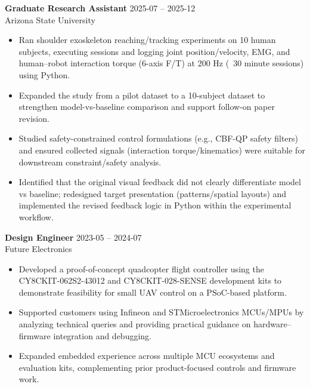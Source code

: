 \documentclass[11pt]{article}
\begin{document}
\vspace{4pt}

\textbf{ Graduate Research Assistant } \hfill 2025-07 -- 2025-12\\
Arizona State University \\

\begin{itemize}[leftmargin=*,noitemsep]
  
  \item Ran shoulder exoskeleton reaching/tracking experiments on 10 human subjects, executing sessions and logging joint position/velocity, EMG, and human–robot interaction torque (6-axis F/T) at 200 Hz (~30 minute sessions) using Python.
  
  \item Expanded the study from a pilot dataset to a 10-subject dataset to strengthen model-vs-baseline comparison and support follow-on paper revision.
  
  \item Studied safety-constrained control formulations (e.g., CBF-QP safety filters) and ensured collected signals (interaction torque/kinematics) were suitable for downstream constraint/safety analysis.
  
  \item Identified that the original visual feedback did not clearly differentiate model vs baseline; redesigned target presentation (patterns/spatial layouts) and implemented the revised feedback logic in Python within the experimental workflow.
  
\end{itemize}

\vspace{4pt}

\textbf{ Design Engineer } \hfill 2023-05 -- 2024-07\\
Future Electronics \\

\begin{itemize}[leftmargin=*,noitemsep]
  
  \item Developed a proof-of-concept quadcopter flight controller using the CY8CKIT-062S2-43012 and CY8CKIT-028-SENSE development kits to demonstrate feasibility for small UAV control on a PSoC-based platform.
  
  \item Supported customers using Infineon and STMicroelectronics MCUs/MPUs by analyzing technical queries and providing practical guidance on hardware–firmware integration and debugging.
  
  \item Expanded embedded experience across multiple MCU ecosystems and evaluation kits, complementing prior product-focused controls and firmware work.
  
\end{itemize}
\end{document}
